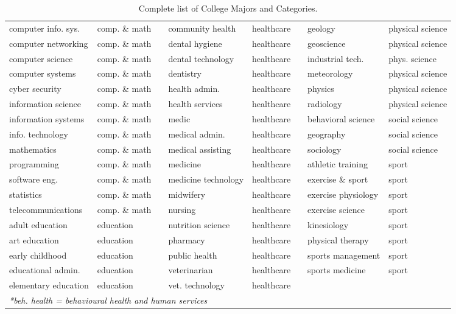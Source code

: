 \begin{table}[ht]
\begin{tabular}{ll p{0.5cm} ll p{0.5cm} ll}
computer info. sys. & comp. \& math && community health & healthcare && geology & physical science \\
computer networking & comp. \& math && dental hygiene & healthcare && geoscience & physical science \\
computer science & comp. \& math && dental technology & healthcare && industrial tech. & phys. science \\
computer systems & comp. \& math && dentistry & healthcare && meteorology & physical science \\
cyber security & comp. \& math && health admin. & healthcare && physics & physical science \\
information science & comp. \& math && health services & healthcare && radiology & physical science \\
information systems & comp. \& math && medic & healthcare && behavioral science & social science \\
info. technology & comp. \& math && medical admin. & healthcare && geography & social science \\
mathematics & comp. \& math && medical assisting & healthcare && sociology & social science \\
programming & comp. \& math && medicine & healthcare && athletic training & sport \\
software eng. & comp. \& math && medicine technology & healthcare && exercise \& sport & sport \\
statistics & comp. \& math && midwifery & healthcare && exercise physiology & sport \\
telecommunications & comp. \& math && nursing & healthcare && exercise science & sport \\
adult education & education && nutrition science & healthcare && kinesiology & sport \\
art education & education && pharmacy & healthcare && physical therapy & sport \\
early childhood & education && public health & healthcare && sports management & sport \\
educational admin. & education && veterinarian & healthcare && sports medicine & sport \\
elementary education & education && vet. technology & healthcare &&  &  \\
\bottomrule
\multicolumn{8}{l}{\textit{*beh. health = behavioural health and human services}} \\
\end{tabular}
\caption{Complete list of College Majors and Categories.}
\label{tab:college-major-dataset}
\end{table}

